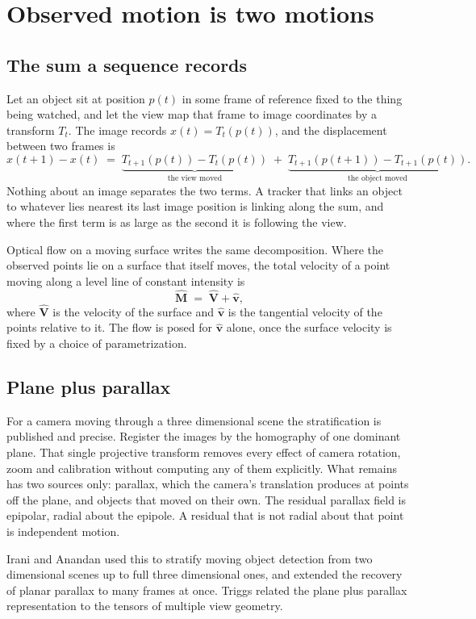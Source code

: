 \chapter{Observed motion is two motions}

\section{The sum a sequence records}

Let an object sit at position $p(t)$ in some frame of reference fixed to the thing being watched,
and let the view map that frame to image coordinates by a transform $T_t$. The image records
$x(t) = T_t(p(t))$, and the displacement between two frames is
\[
x(t+1) - x(t) \;=\; \underbrace{T_{t+1}(p(t)) - T_t(p(t))}_{\text{the view moved}}
\;+\; \underbrace{T_{t+1}(p(t+1)) - T_{t+1}(p(t))}_{\text{the object moved}} .
\]
Nothing about an image separates the two terms. A tracker that links an object to whatever lies
nearest its last image position is linking along the sum, and where the first term is as large as
the second it is following the view.

Optical flow on a moving surface writes the same decomposition. Where the observed points lie on a
surface that itself moves, the total velocity of a point moving along a level line of constant
intensity is
\[
\hat{\mathbf{M}} \;=\; \hat{\mathbf{V}} + \hat{\mathbf{v}},
\]
where $\hat{\mathbf{V}}$ is the velocity of the surface and $\hat{\mathbf{v}}$ is the tangential
velocity of the points relative to it. The flow is posed for $\hat{\mathbf{v}}$ alone, once the
surface velocity is fixed by a choice of parametrization.

\section{Plane plus parallax}

For a camera moving through a three dimensional scene the stratification is published and precise.
Register the images by the homography of one dominant plane. That single projective transform
removes every effect of camera rotation, zoom and calibration without computing any of them
explicitly. What remains has two sources only: parallax, which the camera's translation produces
at points off the plane, and objects that moved on their own. The residual parallax field is
epipolar, radial about the epipole. A residual that is not radial about that point is independent
motion.

Irani and Anandan used this to stratify moving object detection from two dimensional scenes up to
full three dimensional ones, and extended the recovery of planar parallax to many frames at once.
Triggs related the plane plus parallax representation to the tensors of multiple view geometry.

